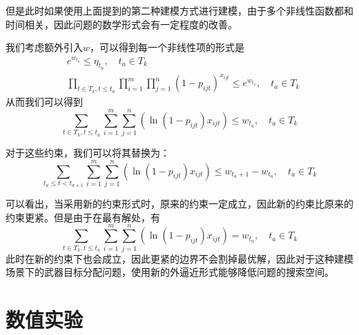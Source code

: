 但是此时如果使用上面提到的第二种建模方式进行建模，由于多个非线性函数都和时间相关，因此问题的数学形式会有一定程度的改善。

我们考虑额外引入$w$，可以得到每一个非线性项的形式是
\begin{align*}
    & e^{w_{t_a}} \leq \eta_{t_a},\quad t_a \in T_k\\
    & \prod_{t \in T_k, t \leq t_a}\prod_{i = 1}^{m}\prod_{j=1}^{n}(1-p_{ijt})^{x_{ijt}} \leq e^{w_{t_a}},\quad t_a \in T_k
\end{align*}
从而我们可以得到
\begin{equation*}
    \sum_{t \in T_k, t \leq t_a}\sum_{i = 1}^{m}\sum_{j=1}^{n}(\ln(1-p_{ijt}) x_{ijt}) \leq w_{t_a},\quad t_a \in T_k
\end{equation*}



对于这些约束，我们可以将其替换为：
\begin{equation*}
    \sum_{t_a \leq t < t_{a + 1}}\sum_{i = 1}^{m}\sum_{j=1}^{n}(\ln(1-p_{ijt}) x_{ijt}) \leq w_{t_a + 1} - w_{t_a},\quad t_a \in T_k
\end{equation*}

可以看出，当采用新的约束形式时，原来的约束一定成立，因此新的约束比原来的约束更紧。但是由于在最有解处，有
\begin{equation*}
    \sum_{t \in T_k, t \leq t_a}\sum_{i = 1}^{m}\sum_{j=1}^{n}(\ln(1-p_{ijt}) x_{ijt}) = w_{t_a},\quad t_a \in T_k
\end{equation*}
此时在新的约束下也会成立，因此更紧的边界不会割掉最优解，因此对于这种建模场景下的武器目标分配问题，使用新的外逼近形式能够降低问题的搜索空间。




\section{数值实验}